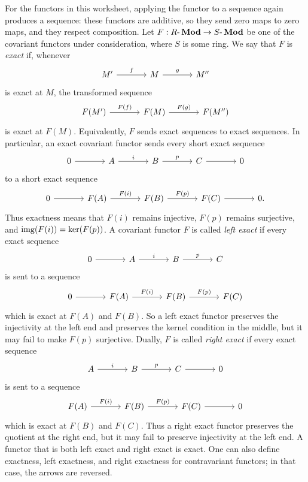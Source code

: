 \documentclass[12pt,reqno]{amsart}
\begin{document}
For the functors in this worksheet, applying the functor to a sequence again produces a sequence: these functors are additive, so they send zero maps to zero maps, and they respect composition. Let $F:R\text{-}\operatorname{\textbf{Mod}}\to S\text{-}\operatorname{\textbf{Mod}}$ be one of the covariant functors under consideration, where $S$ is some ring. We say that $F$ is \emph{exact} if, whenever
\[
\begin{tikzcd}[column sep=large]
M' \arrow[r, "f"] & M \arrow[r, "g"] & M''
\end{tikzcd}
\]
is exact at $M$, the transformed sequence
\[
\begin{tikzcd}[column sep=large]
F(M') \arrow[r, "F(f)"] & F(M) \arrow[r, "F(g)"] & F(M'')
\end{tikzcd}
\]
is exact at $F(M)$. Equivalently, $F$ sends exact sequences to exact sequences. In particular, an exact covariant functor sends every short exact sequence
\[
\begin{tikzcd}[column sep=large]
0 \arrow[r] & A \arrow[r, "i"] & B \arrow[r, "p"] & C \arrow[r] & 0
\end{tikzcd}
\]
to a short exact sequence
\[
\begin{tikzcd}[column sep=large]
0 \arrow[r] & F(A) \arrow[r, "F(i)"] & F(B) \arrow[r, "F(p)"] & F(C) \arrow[r] & 0.
\end{tikzcd}
\]
Thus exactness means that $F(i)$ remains injective, $F(p)$ remains surjective, and $\operatorname{img}(F(i))=\ker(F(p))$. A covariant functor $F$ is called \emph{left exact} if every exact sequence
\[
\begin{tikzcd}[column sep=large]
0 \arrow[r] & A \arrow[r, "i"] & B \arrow[r, "p"] & C
\end{tikzcd}
\]
is sent to a sequence
\[
\begin{tikzcd}[column sep=large]
0 \arrow[r] & F(A) \arrow[r, "F(i)"] & F(B) \arrow[r, "F(p)"] & F(C)
\end{tikzcd}
\]
which is exact at $F(A)$ and $F(B)$. So a left exact functor preserves the injectivity at the left end and preserves the kernel condition in the middle, but it may fail to make $F(p)$ surjective. Dually, $F$ is called \emph{right exact} if every exact sequence
\[
\begin{tikzcd}[column sep=large]
A \arrow[r, "i"] & B \arrow[r, "p"] & C \arrow[r] & 0
\end{tikzcd}
\]
is sent to a sequence
\[
\begin{tikzcd}[column sep=large]
F(A) \arrow[r, "F(i)"] & F(B) \arrow[r, "F(p)"] & F(C) \arrow[r] & 0
\end{tikzcd}
\]
which is exact at $F(B)$ and $F(C)$. Thus a right exact functor preserves the quotient at the right end, but it may fail to preserve injectivity at the left end. A functor that is both left exact and right exact is exact. One can also define exactness, left exactness, and right exactness for contravariant functors; in that case, the arrows are reversed.
\end{document}
